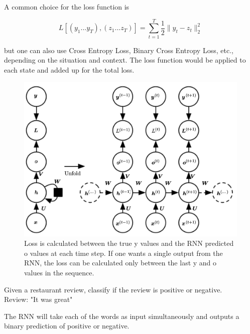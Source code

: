 A common choice for the loss function is 

$$ L \left[ \left( y_{1}...y_{T} \right), \left( z_{1}...z_{T} \right) \right] = \sum_{t=1}^{T} \frac{1}{2} \lVert y_{t} - z_{t} \rVert_{2}^2 $$

but one can also use Cross Entropy Loss, Binary Cross Entropy Loss, etc., depending on the situation and context. The loss function would be applied to each state and added up for the total loss.



\begin{figure}[H]
    \centering
    \includegraphics[scale=0.25]{images/Chapter12/RNN_with_loss.png}
    \caption{Loss is calculated between the true y values and the RNN predicted o values at each time step. If one wants a single output from the RNN, the loss can be calculated only between the last y and o values in the sequence.} 
    \label{fig-rnn-loss}
\end{figure}

\begin{example}
    Given a restaurant review, classify if the review is positive or negative.\\
    Review: "It was great"
\end{example}

The RNN will take each of the words as input simultaneously and outputs a binary prediction of positive or negative. 





